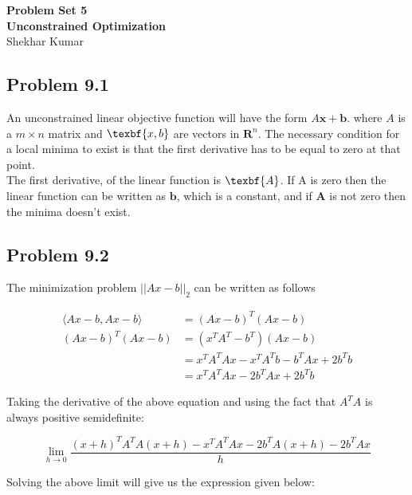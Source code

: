 \documentclass[letterpaper,12pt]{article}
\theoremstyle{definition}
\begin{document}
\begin{flushleft}
\textbf{\large{Problem Set 5}} \\
\vspace{2mm}
\textbf{\large{Unconstrained Optimization}} \\
\vspace{2mm}
Shekhar Kumar\\
\end{flushleft}

\vspace{2mm}

\subsection*{Problem 9.1}

An unconstrained linear objective function will have the form $A\textbf{x} + \textbf{b}$. where $A$ is a $m\times n$ matrix and $\texbf{x,b}$ are vectors in $\mathbf{R}^n$. The necessary condition for a local minima to exist is that the first derivative has to be equal to zero at that point.
\\
The first derivative, of the linear function is $\texbf{A}$. If A is zero then the linear function can be written as $\textbf{b}$, which is a constant, and if $\textbf{A}$ is not zero then the minima doesn't exist. 
\subsection*{Problem 9.2}

The minimization problem $||Ax-b||_2$ can be written as follows

\begin{align*}
\langle Ax-b, Ax-b\rangle &= (Ax-b)^T(Ax-b)\\
(Ax-b)^T(Ax-b) &= (x^TA^T - b^T)(Ax-b) \\ 
&= x^TA^TAx - x^TA^Tb -b^TAx +2b^Tb \\
&= x^TA^TAx -2b^TAx +2b^Tb
\end{align*}
\begin{flushleft}
Taking the derivative of the above equation and using the fact that $A^TA$ is always positive semidefinite:
\end{flushleft}

\begin{equation*}
\lim_{h \to 0}
\frac{(x+h)^TA^TA(x+h) -x^TA^TAx -2b^TA(x+h) -2b^TAx  }{h}
\end{equation*}

\begin{flushleft}
Solving the above limit will give us the expression given below:
\end{flushleft}
\end{document}
